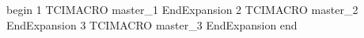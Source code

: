 begin
1
TCIMACRO
master_1
EndExpansion
2
TCIMACRO
master_2
EndExpansion
3
TCIMACRO
master_3
EndExpansion
end
